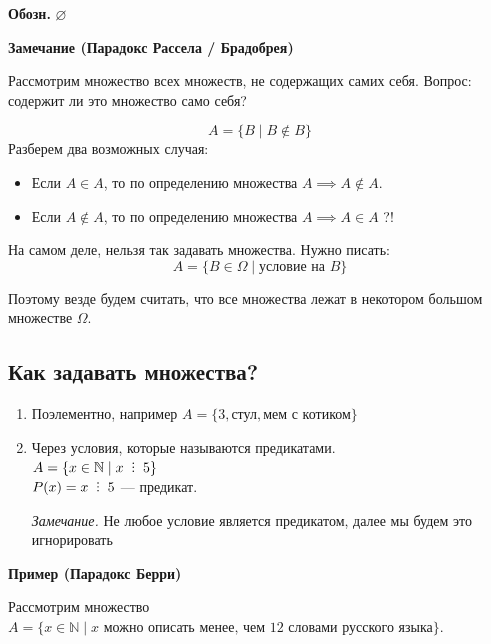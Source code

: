 \documentclass[10pt, a4paper]{article}
\def\divby{%
  \mathrel{\text{\vbox{\baselineskip.65ex\lineskiplimit0pt\hbox{.}\hbox{.}\hbox{.}}}}%
}
\begin{document}
\vspace{0.2cm}
\noindent \textbf{Обозн.} $\varnothing$

\vspace{0.6cm}

\noindent \textbf{Замечание (Парадокс Рассела / Брадобрея)}

\vspace{0.2cm}
\noindent Рассмотрим множество всех множеств, не содержащих самих себя. 
Вопрос: содержит ли это множество само себя?

\[ A = \{ B \mid B \notin B \} \]
\newpage
\noindent Разберем два возможных случая:
\begin{itemize}
    \item Если $A \in A$, то по определению множества $A \implies A \notin A$.
    \item Если $A \notin A$, то по определению множества $A \implies A \in A$ \quad ?!
\end{itemize}

На самом деле, нельзя так задавать множества. Нужно писать:
\[ A = \{ B \in \Omega \mid \text{условие на } B \} \]

\noindent Поэтому везде будем считать, что все множества лежат в некотором большом множестве $\Omega$.

\vspace{0.3cm}

\subsection*{Как задавать множества?}

\begin{enumerate}
    \item Поэлементно, например $A = \{3, \text{стул}, \text{мем с котиком}\}$
    \item Через условия, которые называются предикатами. \\
    $A = \{ x \in \mathbb{N} \mid x \;\divby\; 5 \}$ \\
    $P(x) = x \;\divby\; 5$ --- предикат.
    
    \textit{Замечание.} Не любое условие является предикатом, далее мы будем это игнорировать
\end{enumerate}

\vspace{0.3cm}
\noindent \textbf{Пример (Парадокс Берри)}

\vspace{0.2cm}
\noindent Рассмотрим множество $A = \{ x \in \mathbb{N} \mid x \text{ можно описать менее, чем 12 словами русского языка} \}$.
\end{document}
